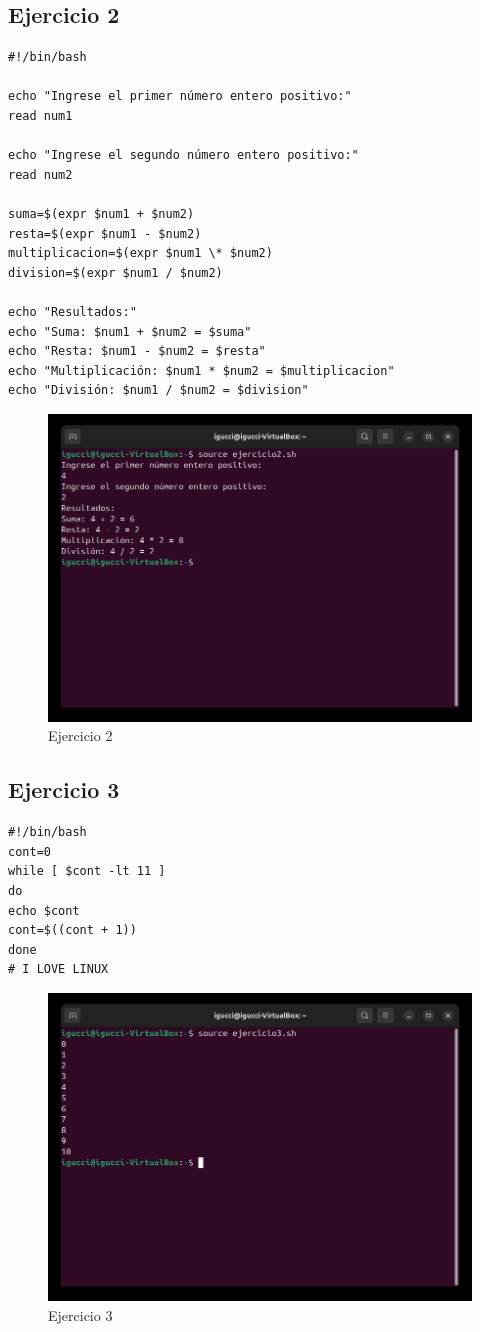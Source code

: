 \documentclass[11pt,twoside]{book}
\begin{document}
\subsection{Ejercicio 2}
\begin{lstlisting}
#!/bin/bash

echo "Ingrese el primer número entero positivo:"
read num1

echo "Ingrese el segundo número entero positivo:"
read num2

suma=$(expr $num1 + $num2)
resta=$(expr $num1 - $num2)
multiplicacion=$(expr $num1 \* $num2)
division=$(expr $num1 / $num2)

echo "Resultados:"
echo "Suma: $num1 + $num2 = $suma"
echo "Resta: $num1 - $num2 = $resta"
echo "Multiplicación: $num1 * $num2 = $multiplicacion"
echo "División: $num1 / $num2 = $division"
\end{lstlisting}

\begin{figure}
    \centering
    \includegraphics[width=0.5\linewidth]{Ej2.png}
    \caption{Ejercicio 2}

\end{figure}

\subsection{Ejercicio 3}
\begin{lstlisting}
#!/bin/bash
cont=0
while [ $cont -lt 11 ]
do
echo $cont
cont=$((cont + 1))
done
# I LOVE LINUX
\end{lstlisting}
\begin{figure}
    \centering
    \includegraphics[width=0.5\linewidth]{Ej3.png}
    \caption{Ejercicio 3}

\end{figure}
\end{document}
